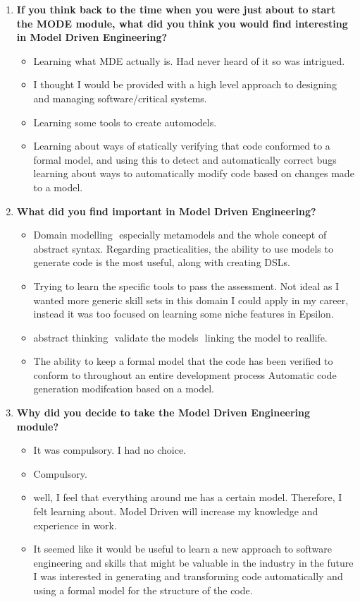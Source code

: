 \documentclass[12pt, a4paper]{report}
\begin{document}
\begin{appendices}
\begin{enumerate}
\item \textbf{If you think back to the time when you were just about to start the MODE module, what did you think you would find interesting in Model ­Driven Engineering?}
\begin{itemize}
\item Learning what MDE actually is. Had never heard of it so was intrigued.
\item I thought I would be provided with a high level approach to designing and managing software/critical systems.
\item Learning some tools to create auto­models.
\item Learning about ways of statically verifying that code conformed to a formal model, and using this to detect and automatically correct bugs learning about ways to automatically modify code based on changes made to a model.
\end{itemize}

\item \textbf{What did you find important in Model­ Driven Engineering?}
\begin{itemize}
\item Domain modelling ­ especially metamodels and the whole concept of abstract syntax. Regarding practicalities, the ability to use models to generate code is the most useful, along with creating DSLs.
\item Trying to learn the specific tools to pass the assessment. Not ideal as I wanted more generic
skill sets in this domain I could apply in my career, instead it was too focused on learning some niche features in Epsilon.
\item abstract thinking ­ validate the models ­ linking the model to real­life.
\item The ability to keep a formal model that the code has been verified to conform to throughout
an entire development process Automatic code generation modifcation based on a model.
\end{itemize}

\item \textbf{ Why did you decide to take the Model ­Driven Engineering module?}
\begin{itemize}
\item It was compulsory. I had no choice.
\item Compulsory.
\item well, I feel that everything around me has a certain model. Therefore, I felt learning about. Model­ Driven will increase my knowledge and experience in work. 
\item It seemed like it would be useful to learn a new approach to software engineering and skills that might be valuable in the industry in the future I was interested in generating and transforming code automatically and using a formal model for the structure of the code.
\end{itemize}



\end{enumerate}
\end{appendices}
\end{document}

